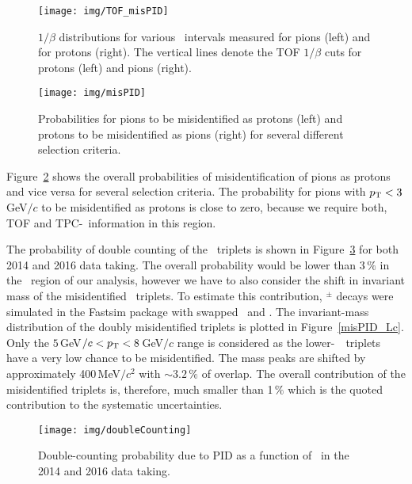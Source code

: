 \begin{figure}[!htb]
\centering
\texttt{[image: img/TOF\_misPID]}
\caption[ $1/\beta$ distributions for pions and for protons.]{\label{TOF_misPID} $1/\beta$ distributions for various \pt\ intervals measured for pions (left) and for protons (right)\@. The vertical lines denote the TOF $1/\beta$ cuts for protons (left) and pions (right).}
\end{figure}

\begin{figure}[!htb]
\centering
\texttt{[image: img/misPID]}
\caption[Probabilities for pions to be misidentified as protons and protons to be misidentified as pions.]{\label{misPID} Probabilities for pions to be misidentified as protons (left) and protons to be misidentified as pions (right) for several different selection criteria. }
\end{figure}

Figure~\ref{misPID} shows the overall probabilities of misidentification of pions as protons and vice versa for several selection criteria. The probability for pions with ${p_{\mathrm{T}}} < 3\,$GeV$/c$ to be misidentified as protons is close to zero, because we require both, TOF and TPC-\dedx\ information in this region.

The probability of double counting of the \Lambdac\ triplets is shown in Figure~\ref{doubleCounting} for both 2014 and 2016 data taking. The overall probability would be lower than 3$\,\%$ in the \pt\ region of our analysis, however we have to also consider the shift in invariant mass of the misidentified \pKpi\ triplets. To estimate this contribution, \Lambdac$^\pm$ decays were simulated in the Fastsim package with swapped \pipm\ and \ppm. The invariant-mass distribution of the doubly misidentified triplets is plotted in Figure~\ref{misPID_Lc}\@. Only the $5\,$GeV$/c < {p_{\mathrm{T}}} < 8\,$GeV$/c$ range is considered as the lower-\pt\ \Lambdac\ triplets have a very low chance to be misidentified. The mass peaks are shifted by approximately 400$\,$MeV$/c^2$ with $\sim 3.2\,\%$ of overlap. The overall contribution of the misidentified triplets is, therefore, much smaller than 1$\,\%$ which is the quoted contribution to the systematic uncertainties.

\begin{figure}[!htb]
\centering
\texttt{[image: img/doubleCounting]}
\caption[Double-counting probability due to PID.]{\label{doubleCounting} Double-counting probability due to PID as a function of \pt\ in the 2014 and 2016 data taking.}
\end{figure}


